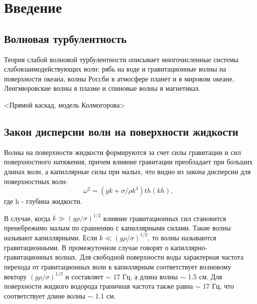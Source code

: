 \chapter{Введение}\label{chapt1}
\section{Волновая турбулентность}%
Теория слабой волновой турбулентности описывает многочисленные системы слабовзаимодействующих волн: рябь на воде и гравитационные волны на поверхности океана, волны Россби в атмосфере планет и в мировом океане, Ленгмюровские волны в плазме и спиновые волны в магнетиках.

<Прямой каскад, модель Колмогорова>
\section{Закон дисперсии волн на поверхности жидкости}%

Волны на поверхности жидкости формируются за счет силы гравитации и сил поверхностного натяжения, причем влияние гравитации преобладает при больших длинах волн, а капиллярные силы при малых, что видно из закона дисперсии для поверхностных волн: 
\begin{equation}
 \label{eq:disper_dip}
\omega^2 = (gk + \sigma/\rho k^3)th(kh),
\end{equation}
где h - глубина жидкости.

В случае, когда $k \gg (g\rho/\sigma)^{1/2}$ влияние гравитационных сил становится пренебрежимо малым по сравнению 
с капиллярными силами. Такие волны называют капиллярными. Если $k \ll (g\rho/\sigma)^{1/2}$, то волны называются гравитационными. В промежуточном случае говорят о капиллярно-гравитационных волнах. Для свободной поверхности воды характерная частота перехода от гравитационных волн к капиллярным соответствует волновому вектору $(g\rho/\sigma)^{1/2}$ и составляет $\sim$ 17 Гц, а длина волны $\sim$ 1.5 см. Для поверхности жидкого водорода граничная частота также равна $\sim$ 17 Гц, что соответствует длине волны $\sim$ 1.1 см.


